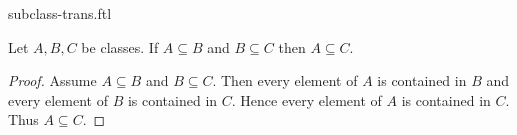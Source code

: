\documentclass{stex}
\begin{document}
\begin{smodule}{subclass-trans.ftl}

  \begin{forthel}
  \end{forthel}

  \begin{forthel}
    \begin{proposition}
      Let $A, B, C$ be classes.
      If $A \subseteq B$ and $B \subseteq C$ then $A \subseteq C$.
    \end{proposition}
    \begin{proof}
      Assume $A \subseteq B$ and $B \subseteq C$.
      Then every element of $A$ is contained in $B$ and every element of $B$ is contained in $C$.
      Hence every element of $A$ is contained in $C$.
      Thus $A \subseteq C$.
    \end{proof}
  \end{forthel}
\end{smodule}
\end{document}
